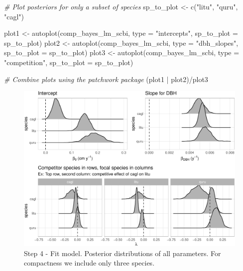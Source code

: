 \documentclass[12pt]{article}
\newenvironment{Shaded}{\begin{snugshade}}{\end{snugshade}}
\newcommand{\AttributeTok}[1]{\textcolor[rgb]{0.77,0.63,0.00}{#1}}
\newcommand{\CommentTok}[1]{\textcolor[rgb]{0.56,0.35,0.01}{\textit{#1}}}
\newcommand{\FunctionTok}[1]{\textcolor[rgb]{0.00,0.00,0.00}{#1}}
\newcommand{\NormalTok}[1]{#1}
\newcommand{\OtherTok}[1]{\textcolor[rgb]{0.56,0.35,0.01}{#1}}
\newcommand{\SpecialCharTok}[1]{\textcolor[rgb]{0.00,0.00,0.00}{#1}}
\newcommand{\StringTok}[1]{\textcolor[rgb]{0.31,0.60,0.02}{#1}}
\begin{document}
\begin{Shaded}
\begin{Highlighting}[]
\CommentTok{\# Plot posteriors for only a subset of species}
\NormalTok{sp\_to\_plot }\OtherTok{\textless{}{-}} \FunctionTok{c}\NormalTok{(}\StringTok{"litu"}\NormalTok{, }\StringTok{"quru"}\NormalTok{, }\StringTok{"cagl"}\NormalTok{)}

\NormalTok{plot1 }\OtherTok{\textless{}{-}} \FunctionTok{autoplot}\NormalTok{(comp\_bayes\_lm\_scbi, }\AttributeTok{type =} \StringTok{"intercepts"}\NormalTok{, }\AttributeTok{sp\_to\_plot =}\NormalTok{ sp\_to\_plot)}
\NormalTok{plot2 }\OtherTok{\textless{}{-}} \FunctionTok{autoplot}\NormalTok{(comp\_bayes\_lm\_scbi, }\AttributeTok{type =} \StringTok{"dbh\_slopes"}\NormalTok{, }\AttributeTok{sp\_to\_plot =}\NormalTok{ sp\_to\_plot)}
\NormalTok{plot3 }\OtherTok{\textless{}{-}} \FunctionTok{autoplot}\NormalTok{(comp\_bayes\_lm\_scbi, }\AttributeTok{type =} \StringTok{"competition"}\NormalTok{, }\AttributeTok{sp\_to\_plot =}\NormalTok{ sp\_to\_plot)}

\CommentTok{\# Combine plots using the patchwork package}
\NormalTok{(plot1 }\SpecialCharTok{|}\NormalTok{ plot2)}\SpecialCharTok{/}\NormalTok{plot3}
\end{Highlighting}
\end{Shaded}

\begin{figure}

{\centering \includegraphics[width=1\linewidth]{Figures/scbi-posterior-viz-1} 

}

\caption{Step 4 - Fit model. Posterior distributions of all parameters. For compactness we include only three species.}\label{fig:scbi-posterior-viz}
\end{figure}
\end{document}
